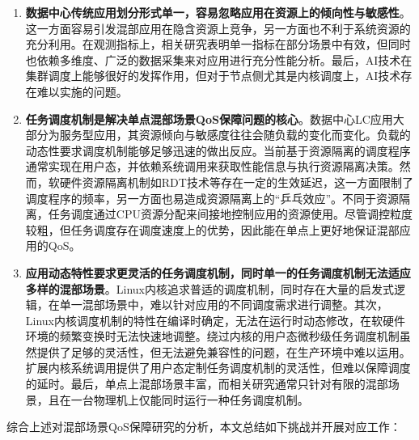 \begin{enumerate}
    \item \textbf{数据中心传统应用划分形式单一，容易忽略应用在资源上的倾向性与敏感性}。这一方面容易引发混部应用在隐含资源上竞争，另一方面也不利于系统资源的充分利用。在观测指标上，相关研究表明单一指标在部分场景中有效，但同时也依赖多维度、广泛的数据采集来对应用进行充分性能分析。最后，AI技术在集群调度上能够很好的发挥作用，但对于节点侧尤其是内核调度上，AI技术存在难以实施的问题。
    
    \item \textbf{任务调度机制是解决单点混部场景QoS保障问题的核心}。数据中心LC应用大部分为服务型应用，其资源倾向与敏感度往往会随负载的变化而变化。负载的动态性要求调度机制能够足够迅速的做出反应。当前基于资源隔离的调度程序通常实现在用户态，并依赖系统调用来获取性能信息与执行资源隔离决策。然而，软硬件资源隔离机制如RDT技术等存在一定的生效延迟，这一方面限制了调度程序的频率，另一方面也易造成资源隔离上的“乒乓效应”。不同于资源隔离，任务调度通过CPU资源分配来间接地控制应用的资源使用。尽管调控粒度较粗，但任务调度存在调度速度上的优势，因此能在单点上更好地保证混部应用的QoS。
    
    \item \textbf{应用动态特性要求更灵活的任务调度机制，同时单一的任务调度机制无法适应多样的混部场景}。Linux内核追求普适的调度机制，同时存在大量的启发式逻辑，在单一混部场景中，难以针对应用的不同调度需求进行调整。其次，Linux内核调度机制的特性在编译时确定，无法在运行时动态修改，在软硬件环境的频繁变换时无法快速地调整。绕过内核的用户态微秒级任务调度机制虽然提供了足够的灵活性，但无法避免兼容性的问题，在生产环境中难以运用。扩展内核系统调用提供了用户态定制任务调度机制的灵活性，但难以保障调度的延时。最后，单点上混部场景丰富，而相关研究通常只针对有限的混部场景，且在一台物理机上仅能同时运行一种任务调度机制。
\end{enumerate}

综合上述对混部场景QoS保障研究的分析，本文总结如下挑战并开展对应工作：

